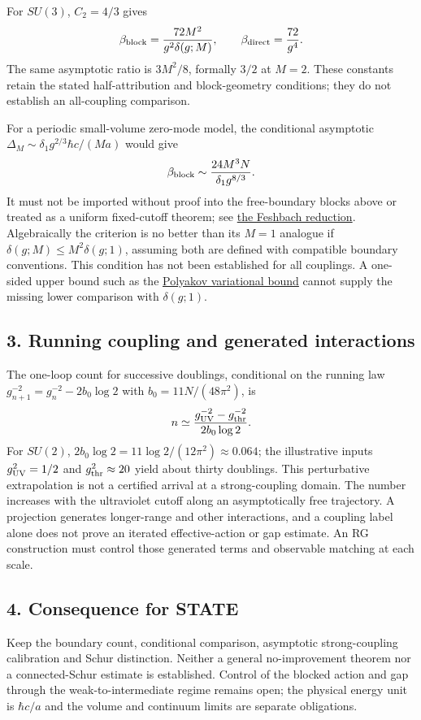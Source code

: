 \documentclass[11pt,a4paper]{article}
\begin{document}
For \(SU(3)\), \(C_2=4/3\) gives
\[\beta_{\rm block}=\frac{72M^2}{g^2\delta(g;M)},\qquad
\beta_{\rm direct}=\frac{72}{g^4}.\] The same asymptotic ratio is
\(3M^2/8\), formally \(3/2\) at \(M=2\). These constants retain the
stated half-attribution and block-geometry conditions; they do not
establish an all-coupling comparison.

For a periodic small-volume zero-mode model, the conditional asymptotic
\(\Delta_M\sim\delta_1g^{2/3}\hbar c/(Ma)\) would give
\[\beta_{\rm block}\sim\frac{24M^3N}{\delta_1g^{8/3}}.\] It must not be
imported without proof into the free-boundary blocks above or treated as
a uniform fixed-cutoff theorem; see
\href{weak-coupling-feshbach-reduction.md}{the Feshbach reduction}.
Algebraically the criterion is no better than its \(M=1\) analogue if
\(\delta(g;M)\le M^2\delta(g;1)\), assuming both are defined with
compatible boundary conventions. This condition has not been established
for all couplings. A one-sided upper bound such as the
\href{lattice-gap-upper-bounds.md\#spatial-polyakov-loop-trials}{Polyakov
variational bound} cannot supply the missing lower comparison with
\(\delta(g;1)\).

\hypertarget{running-coupling-and-generated-interactions}{%
\subsection{3. Running coupling and generated
interactions}\label{running-coupling-and-generated-interactions}}

The one-loop count for successive doublings, conditional on the running
law \(g_{n+1}^{-2}=g_n^{-2}-2b_0\log2\) with \(b_0=11N/(48\pi^2)\), is
\[n\simeq\frac{g_{\rm UV}^{-2}-g_{\rm thr}^{-2}}{2b_0\log2}.\] For
\(SU(2)\), \(2b_0\log2=11\log2/(12\pi^2)\approx0.064\); the illustrative
inputs \(g_{\rm UV}^2=1/2\) and \(g_{\rm thr}^2\approx20\) yield about
thirty doublings. This perturbative extrapolation is not a certified
arrival at a strong-coupling domain. The number increases with the
ultraviolet cutoff along an asymptotically free trajectory. A projection
generates longer-range and other interactions, and a coupling label
alone does not prove an iterated effective-action or gap estimate. An RG
construction must control those generated terms and observable matching
at each scale.

\hypertarget{consequence-for-state}{%
\subsection{4. Consequence for STATE}\label{consequence-for-state}}

Keep the boundary count, conditional comparison, asymptotic
strong-coupling calibration and Schur distinction. Neither a general
no-improvement theorem nor a connected-Schur estimate is established.
Control of the blocked action and gap through the weak-to-intermediate
regime remains open; the physical energy unit is \(\hbar c/a\) and the
volume and continuum limits are separate obligations.
\end{document}
